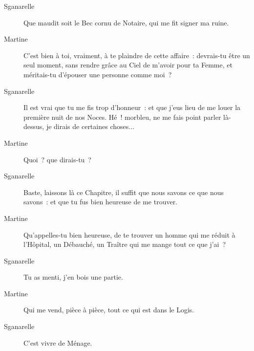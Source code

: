 \documentclass[french,twoside]{book} %
\begin{document}
 \begin{description} \item[Sganarelle] 

Que maudit soit le Bec cornu de Notaire, qui me fit signer ma ruine.\end{description}
 \begin{description} \item[Martine] 

C’est bien à toi, vraiment, à te plaindre de cette affaire : devrais-tu être un seul moment, sans rendre grâce au Ciel de m’avoir pour ta Femme, et méritais-tu d’épouser une personne comme moi ?\end{description}
 \begin{description} \item[Sganarelle] 

Il est vrai que tu me fis trop d’honneur : et que j’eus lieu de me louer la première nuit de nos Noces. Hé ! morbleu, ne me fais point parler là-dessus, je dirais de certaines choses...\end{description}
 \begin{description} \item[Martine] 

Quoi ? que dirais-tu ?\end{description}
 \begin{description} \item[Sganarelle] 

Baste, laissons là ce Chapitre, il suffit que nous savons ce que nous savons : et que tu fus bien heureuse de me trouver.\end{description}
 \begin{description} \item[Martine] 

Qu’appelles-tu bien heureuse, de te trouver un homme qui me réduit à l’Hôpital, un Débauché, un Traître qui me mange tout ce que j’ai ?\end{description}
 \begin{description} \item[Sganarelle] 

Tu as menti, j’en bois une partie.\end{description}
 \begin{description} \item[Martine] 

Qui me vend, pièce à pièce, tout ce qui est dans le Logis.\end{description}
 \begin{description} \item[Sganarelle] 

C’est vivre de Ménage.\end{description}
\end{document}

